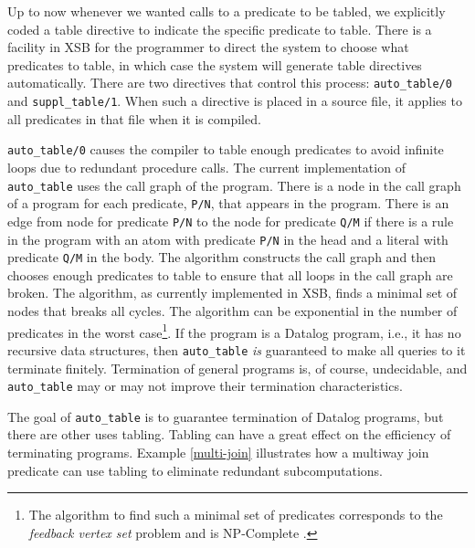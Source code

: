 Up to now whenever we wanted calls to a predicate to be tabled, we
explicitly coded a table directive to indicate the specific predicate
to table.  There is a facility in XSB for the programmer to direct the
system to choose what predicates to table, in which case the system
will generate table directives automatically.  There are two
directives that control this process: \verb|auto_table/0| and
\verb|suppl_table/1|.  When such a directive is placed in a source
file, it applies to all predicates in that file when it is compiled.

{\tt auto\_table/0} causes the compiler to table enough predicates to
avoid infinite loops due to redundant procedure calls.  The current
implementation of \verb|auto_table| uses the call graph of the
program.  There is a node in the call graph of a program for each
predicate, \verb|P/N|, that appears in the program.  There is an edge
from node for predicate \verb|P/N| to the node for predicate
\verb|Q/M| if there is a rule in the program with an atom with
predicate \verb|P/N| in the head and a literal with predicate
\verb|Q/M| in the body.  The algorithm constructs the call graph and
then chooses enough predicates to table to ensure that all loops in
the call graph are broken.  The algorithm, as currently implemented in
XSB, finds a minimal set of nodes that breaks all cycles. The
algorithm can be exponential in the number of predicates in the worst
case\footnote{The algorithm to find such a minimal set of predicates
corresponds to the {\em feedback vertex set} problem and is
NP-Complete \cite{GaJo79}.}.  If the program is a Datalog program,
i.e., it has no recursive data structures, then \verb|auto_table| {\em
is} guaranteed to make all queries to it terminate finitely.
Termination of general programs is, of course, undecidable, and
\verb|auto_table| may or may not improve their termination
characteristics.

The goal of \verb|auto_table| is to guarantee termination of Datalog
programs, but there are other uses tabling.  Tabling can have a great
effect on the efficiency of terminating programs.  Example
\ref{multi-join} illustrates how a multiway join predicate can use
tabling to eliminate redundant subcomputations.


